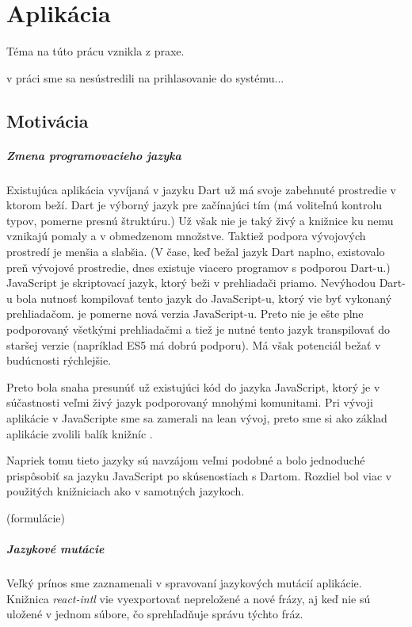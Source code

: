 \chapter{Aplikácia}%
Téma na túto prácu vznikla z praxe. 

\TODO{} v práci sme sa nesústredili na prihlasovanie do systému...

\section{Motivácia}

\paragraph{Zmena programovacieho jazyka}
Existujúca aplikácia vyvíjaná v jazyku Dart už má svoje zabehnuté prostredie v ktorom beží. Dart je výborný jazyk pre začínajúci tím (má voliteľnú kontrolu typov, pomerne presnú štruktúru.) Už však nie je taký živý a knižnice ku nemu vznikajú pomaly a v obmedzenom množstve. 
Taktiež podpora vývojových prostredí je menšia a slabšia. (V čase, keď bežal jazyk Dart naplno, existovalo preň vývojové prostredie, dnes existuje viacero programov s podporou Dart-u.) 
JavaScript je skriptovací jazyk, ktorý beži v prehliadači priamo. Nevýhodou Dart-u bola nutnosť kompilovať tento jazyk do JavaScript-u, ktorý vie byť vykonaný prehliadačom. \JS{} je pomerne nová verzia JavaScript-u. Preto nie je ešte plne podporovaný všetkými prehliadačmi a tiež je nutné tento jazyk transpilovať do staršej verzie (napríklad ES5 má dobrú podporu). Má však potenciál bežať v budúcnosti rýchlejšie.

Preto bola snaha presunúť už existujúci kód do jazyka JavaScript, ktorý je v súčastnosti veľmi živý jazyk podporovaný mnohými komunitami. Pri vývoji aplikácie v JavaScripte sme sa zamerali na lean vývoj, preto sme si ako základ aplikácie zvolili balík knižníc \cite[este]{Este}.%

Napriek tomu tieto jazyky sú navzájom veľmi podobné a bolo jednoduché prispôsobiť sa jazyku JavaScript po skúsenostiach s Dartom.
Rozdiel bol viac v použitých knižniciach ako v samotných jazykoch.

\TODO{} (formulácie)

\paragraph{Jazykové mutácie}
Veľký prínos sme zaznamenali v spravovaní jazykových mutácií aplikácie. Knižnica \emph{react-intl} vie vyexportovať nepreložené a nové frázy, aj keď nie sú uložené v jednom súbore, čo sprehľadňuje správu týchto fráz.

